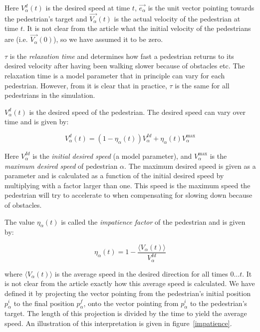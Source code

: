 Here $V_{\alpha}^{d}(t)$ is the desired speed at time $t$,
$\overrightarrow{e_{\alpha}}$ is the unit vector pointing towards the
pedestrian's target and  $\overrightarrow{V_{\alpha}}(t)$ is the actual
velocity of the pedestrian at time $t$. It is not clear from the article what
the initial velocity of the pedestrians are (i.e.
$\overrightarrow{V_\alpha}(0)$), so we have assumed it to be zero.


$\tau$ is the \emph{relaxation time} and determines how fast a pedestrian
returns to its desired velocity after having been walking slower because of
obstacles etc. The relaxation time is a model parameter that in principle can vary
for each pedestrian. However, from \cite{self-org} it is clear that in
practice, $\tau$ is the same for all pedestrians in the simulation.

$V_{\alpha}^{d}(t)$ is the desired speed of the pedestrian. The desired speed
can vary over time and is given by:

\begin{equation}\label{eqn:desired-speed}
    V_{\alpha}^{d}(t) = \left( 1 - \eta_{\alpha}(t) \right)
    V_{\alpha}^{Id} +
    \eta_{\alpha}(t) V_{\alpha}^{\text{max}}
\end{equation}

Here $V_{\alpha}^{Id}$ is the \emph{initial desired speed} (a model
parameter), and $V_{\alpha}^{\text{max}}$ is the \emph{maximum desired speed}
of pedestrian $\alpha$. The maximum desired speed is given as a parameter and
is calculated as a function of the initial desired speed by multiplying with a
factor larger than one. This speed is the maximum speed the pedestrian will
try to accelerate to when compensating for slowing down because of obstacles.

The value $\eta_{\alpha}(t)$ is called the \emph{impatience factor} of the
pedestrian and is given by:

\begin{equation}\label{eqn:impatience}
	\eta_{\alpha}(t) =
    1 - \frac{\langle V_{\alpha}(t)\rangle}{V^{Id}_{\alpha}}
\end{equation}

where $\langle V_{\alpha}(t) \rangle$ is the average speed in the desired
direction for all times $0\dots t$. It is not clear from the article exactly
how this average speed is calculated. We have defined it by projecting the
vector pointing from the pedestrian's initial position $p^i_\alpha$ to the final 
position $p^f_\alpha$, 
onto the vector
pointing from $p^i_\alpha$ to the pedestrian's target. The length of this
projection is divided by the time to yield the average speed. An
illustration of this interpretation is given in figure~\ref{impatience}.

